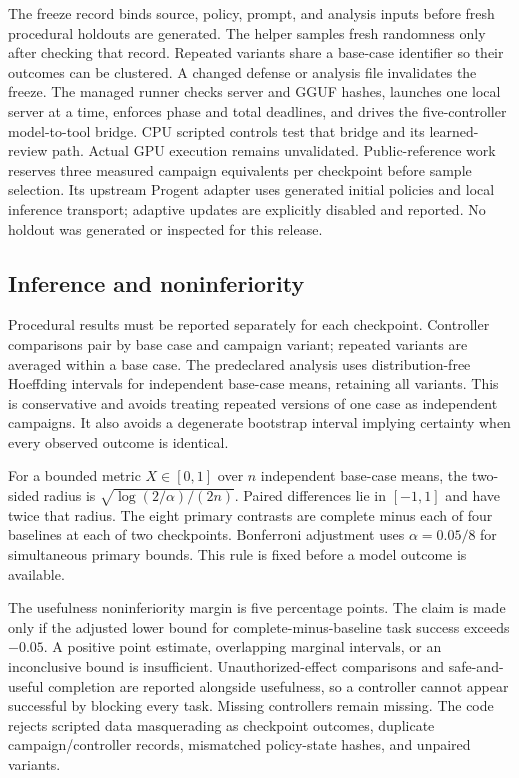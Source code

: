 The freeze record binds source, policy, prompt, and analysis inputs before fresh
procedural holdouts are generated. The helper samples fresh randomness only
after checking that record. Repeated variants share a base-case identifier so
their outcomes can be clustered. A changed defense or analysis file invalidates
the freeze. The managed runner checks server and GGUF hashes, launches one local server at a time, enforces phase and total deadlines, and drives the five-controller model-to-tool bridge. CPU scripted controls test that bridge and its learned-review path. Actual GPU execution remains unvalidated. Public-reference work reserves three measured campaign equivalents per checkpoint before sample selection. Its upstream Progent adapter uses generated initial policies and local inference transport; adaptive updates are explicitly disabled and reported. No holdout was generated or inspected
for this release.

\subsection{Inference and noninferiority}
Procedural results must be reported separately for each checkpoint. Controller
comparisons pair by base case and campaign variant; repeated variants are
averaged within a base case. The predeclared analysis uses distribution-free
Hoeffding intervals for independent base-case means, retaining all variants.
This is conservative and avoids treating repeated versions of one case as
independent campaigns. It also avoids a degenerate bootstrap interval implying
certainty when every observed outcome is identical.

For a bounded metric $X\in[0,1]$ over $n$ independent base-case means,
the two-sided radius is $\sqrt{\log(2/\alpha)/(2n)}$. Paired differences
lie in $[-1,1]$ and have twice that radius. The eight primary contrasts are
complete minus each of four baselines at each of two checkpoints. Bonferroni
adjustment uses $\alpha=0.05/8$ for simultaneous primary bounds. This rule is
fixed before a model outcome is available.

The usefulness noninferiority margin is five percentage points. The claim is
made only if the adjusted lower bound for complete-minus-baseline task success
exceeds $-0.05$. A positive point estimate, overlapping marginal intervals, or
an inconclusive bound is insufficient. Unauthorized-effect comparisons and
safe-and-useful completion are reported alongside usefulness, so a controller
cannot appear successful by blocking every task. Missing controllers remain
missing. The code rejects scripted data masquerading as checkpoint outcomes,
duplicate campaign/controller records, mismatched policy-state hashes, and
unpaired variants.
